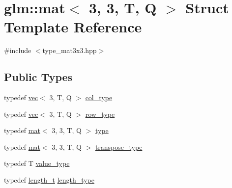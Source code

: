 \hypertarget{structglm_1_1mat_3_013_00_013_00_01_t_00_01_q_01_4}{}\section{glm\+:\+:mat$<$ 3, 3, T, Q $>$ Struct Template Reference}
\label{structglm_1_1mat_3_013_00_013_00_01_t_00_01_q_01_4}


{\ttfamily \#include $<$type\+\_\+mat3x3.\+hpp$>$}

\subsection*{Public Types}
\begin{DoxyCompactItemize}
\item 
typedef \hyperlink{structglm_1_1vec}{vec}$<$ 3, T, Q $>$ \hyperlink{structglm_1_1mat_3_013_00_013_00_01_t_00_01_q_01_4_a4d84bef3685131dbb0ac43cac0a3b147}{col\+\_\+type}
\item 
typedef \hyperlink{structglm_1_1vec}{vec}$<$ 3, T, Q $>$ \hyperlink{structglm_1_1mat_3_013_00_013_00_01_t_00_01_q_01_4_aa7593e64ea44bcccb91580e6f6a45110}{row\+\_\+type}
\item 
typedef \hyperlink{structglm_1_1mat}{mat}$<$ 3, 3, T, Q $>$ \hyperlink{structglm_1_1mat_3_013_00_013_00_01_t_00_01_q_01_4_a2e88f5a6401ca62e81b61443f0148ff0}{type}
\item 
typedef \hyperlink{structglm_1_1mat}{mat}$<$ 3, 3, T, Q $>$ \hyperlink{structglm_1_1mat_3_013_00_013_00_01_t_00_01_q_01_4_a4ad9d88cb078cca298550c57bad63c21}{transpose\+\_\+type}
\item 
typedef T \hyperlink{structglm_1_1mat_3_013_00_013_00_01_t_00_01_q_01_4_a1fba85531bcdc9309f4755f30f44dd6f}{value\+\_\+type}
\item 
typedef \hyperlink{namespaceglm_a090a0de2260835bee80e71a702492ed9}{length\+\_\+t} \hyperlink{structglm_1_1mat_3_013_00_013_00_01_t_00_01_q_01_4_ae1b8524f20936516a48384a2841b5b9d}{length\+\_\+type}
\end{DoxyCompactItemize}
